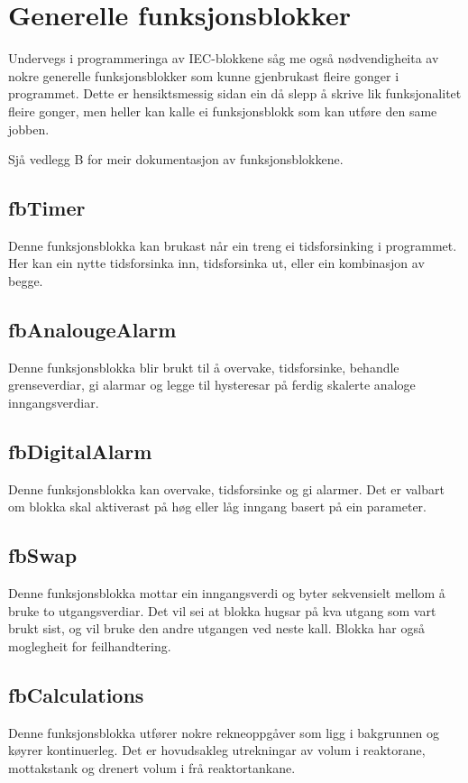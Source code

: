 \section{Generelle funksjonsblokker}
\thispagestyle{fancy}

Undervegs i programmeringa av \gls{IEC}-blokkene såg me også nødvendigheita av nokre generelle funksjonsblokker
som kunne gjenbrukast fleire gonger i programmet. Dette er hensiktsmessig sidan ein då slepp å skrive lik 
funksjonalitet fleire gonger, men heller kan kalle ei funksjonsblokk som kan utføre den same jobben.

Sjå vedlegg B for meir dokumentasjon av funksjonsblokkene.

\subsection{fbTimer}
Denne funksjonsblokka kan brukast når ein treng ei tidsforsinking i programmet.
Her kan ein nytte tidsforsinka inn, tidsforsinka ut, eller ein kombinasjon av begge.

\subsection{fbAnalougeAlarm}
Denne funksjonsblokka blir brukt til å overvake, tidsforsinke, behandle grenseverdiar, 
gi alarmar og legge til hysteresar på ferdig skalerte analoge inngangsverdiar.

\subsection{fbDigitalAlarm}
Denne funksjonsblokka kan overvake, tidsforsinke og gi alarmer. Det er valbart om blokka skal aktiverast på høg eller låg
inngang basert på ein parameter.

\subsection{fbSwap}\label{sec:1}
Denne funksjonsblokka mottar ein inngangsverdi og byter sekvensielt mellom å bruke to utgangsverdiar. Det vil sei at blokka hugsar på kva utgang som vart brukt sist,
og vil bruke den andre utgangen ved neste kall. Blokka har også moglegheit for feilhandtering.

\subsection{fbCalculations}
Denne funksjonsblokka utfører nokre rekneoppgåver som ligg i bakgrunnen og køyrer kontinuerleg. 
Det er hovudsakleg utrekningar av volum i reaktorane, mottakstank og drenert volum i frå reaktortankane.

